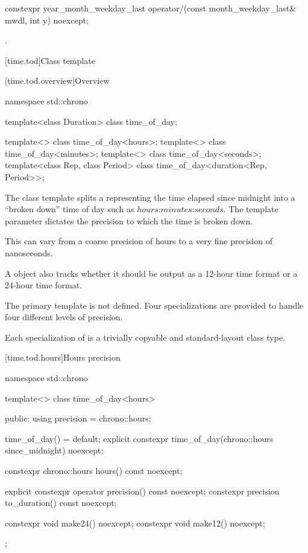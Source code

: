 \begin{itemdecl}
constexpr year_month_weekday_last
  operator/(const month_weekday_last& mwdl, int y) noexcept;
\end{itemdecl}

\begin{itemdescr}
\pnum
\returns {}.
\end{itemdescr}


[time.tod]{Class template }

[time.tod.overview]{Overview}

\begin{codeblock}
namespace std::chrono {
  template<class Duration> class time_of_day;

  template<> class time_of_day<hours>;
  template<> class time_of_day<minutes>;
  template<> class time_of_day<seconds>;
  template<class Rep, class Period> class time_of_day<duration<Rep, Period>>;
}
\end{codeblock}

\pnum
The  class template
splits a  representing the time elapsed since midnight
into a ``broken down'' time of day such as
$hours$:$minutes$:$seconds$.
The  template parameter dictates
the precision to which the time is broken down.
\begin{note}
This can vary from a coarse precision of hours
to a very fine precision of nanoseconds.
\end{note}
A  object also tracks
whether it should be output
as a 12-hour time format or a 24-hour time format.

\pnum
The primary  template is not defined.
Four specializations are provided to handle four different
levels of precision.

\pnum
Each specialization of  is a trivially copyable
and standard-layout class type.

[time.tod.hours]{Hours precision}

\begin{codeblock}
namespace std::chrono {
  template<>
  class time_of_day<hours> {
  public:
    using precision = chrono::hours;

    time_of_day() = default;
    explicit constexpr time_of_day(chrono::hours since_midnight) noexcept;

    constexpr chrono::hours hours() const noexcept;

    explicit constexpr operator  precision()   const noexcept;
    constexpr          precision to_duration() const noexcept;

    constexpr void make24() noexcept;
    constexpr void make12() noexcept;
  };
}
\end{codeblock}

